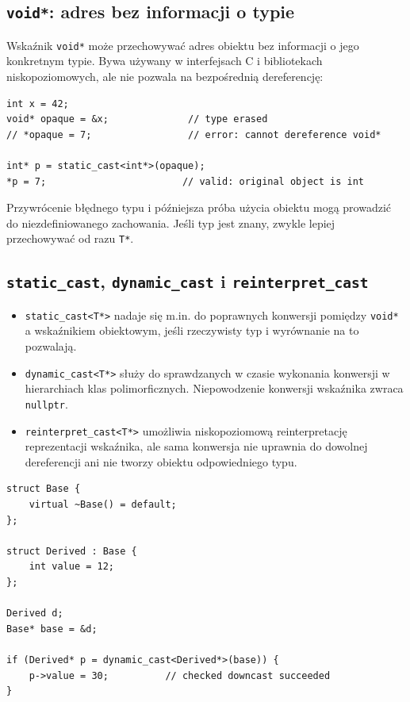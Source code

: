 \subsection{\texttt{void*}: adres bez informacji o typie}

Wskaźnik \texttt{void*} może przechowywać adres obiektu bez
informacji o jego konkretnym typie. Bywa używany w interfejsach C
i bibliotekach niskopoziomowych, ale nie pozwala na bezpośrednią
dereferencję:

\begin{lstlisting}
int x = 42;
void* opaque = &x;              // type erased
// *opaque = 7;                 // error: cannot dereference void*

int* p = static_cast<int*>(opaque);
*p = 7;                        // valid: original object is int
\end{lstlisting}

Przywrócenie błędnego typu i późniejsza próba użycia obiektu
mogą prowadzić do niezdefiniowanego zachowania. Jeśli typ jest
znany, zwykle lepiej przechowywać od razu \texttt{T*}.

\subsection{\texttt{static\_cast}, \texttt{dynamic\_cast} i
\texttt{reinterpret\_cast}}

\begin{itemize}
    \item \texttt{static\_cast<T*>} nadaje się m.in. do poprawnych
    konwersji pomiędzy \texttt{void*} a wskaźnikiem obiektowym,
    jeśli rzeczywisty typ i wyrównanie na to pozwalają.
    \item \texttt{dynamic\_cast<T*>} służy do sprawdzanych w czasie
    wykonania konwersji w hierarchiach klas polimorficznych.
    Niepowodzenie konwersji wskaźnika zwraca \texttt{nullptr}.
    \item \texttt{reinterpret\_cast<T*>} umożliwia niskopoziomową
    reinterpretację reprezentacji wskaźnika, ale sama konwersja
    nie uprawnia do dowolnej dereferencji ani nie tworzy obiektu
    odpowiedniego typu.
\end{itemize}

\begin{lstlisting}
struct Base {
    virtual ~Base() = default;
};

struct Derived : Base {
    int value = 12;
};

Derived d;
Base* base = &d;

if (Derived* p = dynamic_cast<Derived*>(base)) {
    p->value = 30;          // checked downcast succeeded
}
\end{lstlisting}

